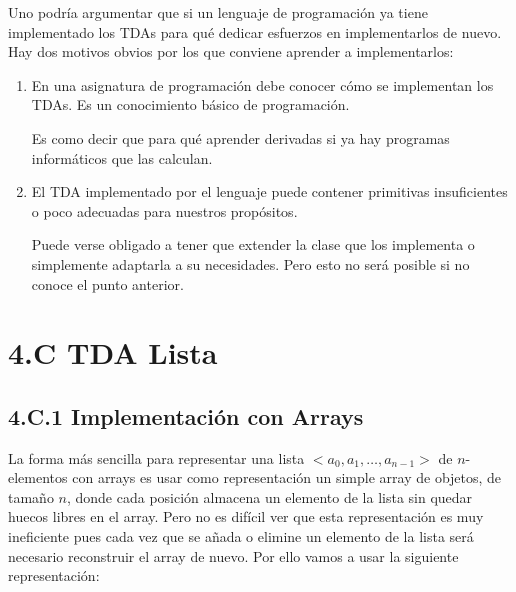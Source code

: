 Uno podría argumentar que si un lenguaje de programación ya tiene implementado los TDAs para qué dedicar esfuerzos en implementarlos de nuevo. Hay dos motivos obvios por los que conviene aprender a implementarlos:
\begin{enumerate}
\item En una asignatura de programación debe conocer cómo se implementan los TDAs. Es un conocimiento básico de programación.

Es como decir que para qué aprender derivadas si ya hay programas informáticos que las calculan.

\item El TDA implementado por el lenguaje puede contener primitivas insuficientes o poco adecuadas para nuestros propósitos. 

Puede verse obligado a tener que extender la clase que los implementa o simplemente adaptarla a su necesidades. Pero esto no será posible si no conoce el punto anterior.
\end{enumerate}





\section*{4.C TDA Lista}








\subsection*{4.C.1 Implementación con Arrays}



La forma más sencilla para representar una lista  $<a_0, a_1, \ldots, a_{n-1}>$ de $n$-elementos con arrays es usar como representación un simple array de objetos,  de tamaño $n$, donde cada posición almacena un elemento de la lista sin quedar huecos libres en el array.
Pero no es difícil ver que esta representación es muy ineficiente pues cada vez que se añada o elimine un elemento de la lista será necesario reconstruir el array de nuevo.
Por ello vamos a usar la siguiente representación:



